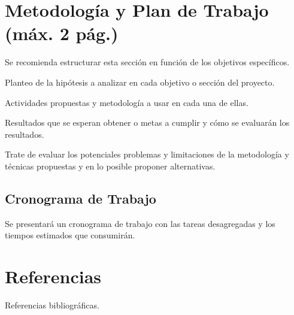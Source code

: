 \documentclass[a4paper,12pt]{article}
\begin{document}
\section{Metodología y Plan de Trabajo (máx. 2 pág.)}
Se recomienda estructurar esta sección en función de los objetivos específicos.

Planteo de la hipótesis a analizar en cada objetivo o sección del proyecto.

Actividades propuestas y metodología a usar en cada una de ellas.

Resultados que se esperan obtener o metas a cumplir y cómo se evaluarán los resultados.

Trate de evaluar los potenciales problemas y limitaciones de la metodología y técnicas propuestas y en lo posible proponer alternativas.

\subsection{Cronograma de Trabajo}
Se presentará un cronograma de trabajo con las tareas desagregadas y los tiempos estimados que consumirán.

\section{Referencias}
Referencias bibliográficas.
\end{document}
